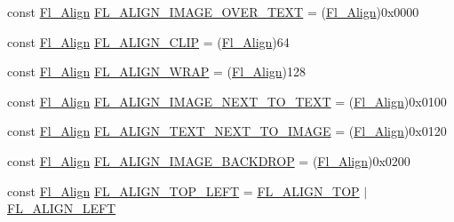 \begin{DoxyCompactItemize}
const \hyperlink{_enumerations_8_h_a44e8bcd1e030e65e4f88cbae64a7c3e3}{Fl\+\_\+\+Align} \hyperlink{_enumerations_8_h_a44f5822e9594733418ec39f7c061d2d7}{F\+L\+\_\+\+A\+L\+I\+G\+N\+\_\+\+I\+M\+A\+G\+E\+\_\+\+O\+V\+E\+R\+\_\+\+T\+E\+XT} = (\hyperlink{_enumerations_8_h_a44e8bcd1e030e65e4f88cbae64a7c3e3}{Fl\+\_\+\+Align})0x0000
\item 
const \hyperlink{_enumerations_8_h_a44e8bcd1e030e65e4f88cbae64a7c3e3}{Fl\+\_\+\+Align} \hyperlink{_enumerations_8_h_a527e2db976be1a8508c226b4ca54eaa7}{F\+L\+\_\+\+A\+L\+I\+G\+N\+\_\+\+C\+L\+IP} = (\hyperlink{_enumerations_8_h_a44e8bcd1e030e65e4f88cbae64a7c3e3}{Fl\+\_\+\+Align})64
\item 
const \hyperlink{_enumerations_8_h_a44e8bcd1e030e65e4f88cbae64a7c3e3}{Fl\+\_\+\+Align} \hyperlink{_enumerations_8_h_ad824439377f8aa436e39c5d12d9fb26f}{F\+L\+\_\+\+A\+L\+I\+G\+N\+\_\+\+W\+R\+AP} = (\hyperlink{_enumerations_8_h_a44e8bcd1e030e65e4f88cbae64a7c3e3}{Fl\+\_\+\+Align})128
\item 
const \hyperlink{_enumerations_8_h_a44e8bcd1e030e65e4f88cbae64a7c3e3}{Fl\+\_\+\+Align} \hyperlink{_enumerations_8_h_ae01274c851cadd0ae5f7c5b519f0245a}{F\+L\+\_\+\+A\+L\+I\+G\+N\+\_\+\+I\+M\+A\+G\+E\+\_\+\+N\+E\+X\+T\+\_\+\+T\+O\+\_\+\+T\+E\+XT} = (\hyperlink{_enumerations_8_h_a44e8bcd1e030e65e4f88cbae64a7c3e3}{Fl\+\_\+\+Align})0x0100
\item 
const \hyperlink{_enumerations_8_h_a44e8bcd1e030e65e4f88cbae64a7c3e3}{Fl\+\_\+\+Align} \hyperlink{_enumerations_8_h_a6500fc80f0febfd4bd87025a3df5cff6}{F\+L\+\_\+\+A\+L\+I\+G\+N\+\_\+\+T\+E\+X\+T\+\_\+\+N\+E\+X\+T\+\_\+\+T\+O\+\_\+\+I\+M\+A\+GE} = (\hyperlink{_enumerations_8_h_a44e8bcd1e030e65e4f88cbae64a7c3e3}{Fl\+\_\+\+Align})0x0120
\item 
const \hyperlink{_enumerations_8_h_a44e8bcd1e030e65e4f88cbae64a7c3e3}{Fl\+\_\+\+Align} \hyperlink{_enumerations_8_h_a1aaa3dafad6349ff2e36c2b94694ddc4}{F\+L\+\_\+\+A\+L\+I\+G\+N\+\_\+\+I\+M\+A\+G\+E\+\_\+\+B\+A\+C\+K\+D\+R\+OP} = (\hyperlink{_enumerations_8_h_a44e8bcd1e030e65e4f88cbae64a7c3e3}{Fl\+\_\+\+Align})0x0200
\item 
const \hyperlink{_enumerations_8_h_a44e8bcd1e030e65e4f88cbae64a7c3e3}{Fl\+\_\+\+Align} \hyperlink{_enumerations_8_h_aa8fc090c53e2f726bd4817189313a0da}{F\+L\+\_\+\+A\+L\+I\+G\+N\+\_\+\+T\+O\+P\+\_\+\+L\+E\+FT} = \hyperlink{_enumerations_8_h_a62b22e4022b39d90a2d3962ae144f2e8}{F\+L\+\_\+\+A\+L\+I\+G\+N\+\_\+\+T\+OP} $\vert$ \hyperlink{_enumerations_8_h_aee67f09771b16bc5da1f1ee860681be5}{F\+L\+\_\+\+A\+L\+I\+G\+N\+\_\+\+L\+E\+FT}
\item 

\end{DoxyCompactItemize}

